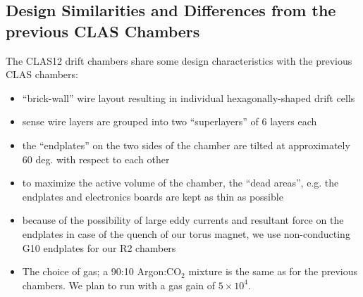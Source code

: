 \subsection{Design Similarities and Differences from the previous CLAS Chambers}
The CLAS12 drift chambers share some design characteristics with the
previous CLAS chambers:
\begin{itemize}
\item ``brick-wall'' wire layout resulting in individual hexagonally-shaped
drift cells
\item sense wire layers are grouped into two ``superlayers'' of 6 layers each
\item the ``endplates'' on the two sides of the chamber are tilted 
at approximately 60 deg. with respect to each other
\item to maximize the active volume of the chamber, the ``dead areas'', e.g.
the endplates and electronics boards are kept as thin as possible
\item because of the possibility of large eddy currents and resultant
force on the endplates in case of the quench of our torus magnet, we
use non-conducting G10 endplates for our R2 chambers
\item The choice of gas; a 90:10 Argon:CO$_2$ mixture is the same
as for the previous chambers.  We plan to run with a gas gain of 
$5 \times 10^4$.
\end{itemize}

